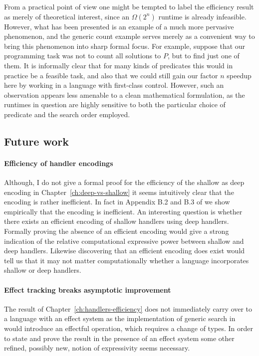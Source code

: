\documentclass[12pt,phd,lfcs,twoside,openright,logo,leftchapter,normalheadings]{infthesis}
\theoremstyle{plain}
\theoremstyle{definition}
\begin{document}
From a practical point of view one might be tempted to label the
efficiency result as merely of theoretical interest, since an
$\Omega(2^n)$ runtime is already infeasible.  However, what has been
presented is an example of a much more pervasive phenomenon, and the
generic count example serves merely as a convenient way to bring this
phenomenon into sharp formal focus. For example, suppose that our
programming task was not to count all solutions to $P$, but to find
just one of them.  It is informally clear that for many kinds of
predicates this would in practice be a feasible task, and also that we
could still gain our factor $n$ speedup here by working in a language
with first-class control.  However, such an observation appears less
amenable to a clean mathematical formulation, as the runtimes in
question are highly sensitive to both the particular choice of
predicate and the search order employed.

\subsection{Future work}

\paragraph{Efficiency of handler encodings} Although, I do not give a
formal proof for the efficiency of the shallow as deep encoding in
Chapter~\ref{ch:deep-vs-shallow} it seems intuitively clear that the
encoding is rather inefficient. In fact in Appendix B.2 and B.3 of
\citet{HillerstromL18} we show empirically that the encoding is
inefficient. An interesting question is whether there exists an
efficient encoding of shallow handlers using deep handlers. Formally
proving the absence of an efficient encoding would give a strong
indication of the relative computational expressive power between
shallow and deep handlers. Likewise discovering that an efficient
encoding does exist would tell us that it may not matter
computationally whether a language incorporates shallow or deep
handlers.

\paragraph{Effect tracking breaks asymptotic improvement} The
result of Chapter~\ref{ch:handlers-efficiency} does not immediately
carry over to a language with an effect system as the implementation
of generic search in \HPCF{} would introduce an effectful operation,
which requires a change of types. In order to state and prove the
result in the presence of an effect system some other refined,
possibly new, notion of expressivity seems necessary.
\end{document}
